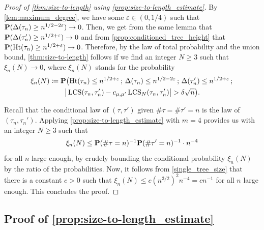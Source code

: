 \documentclass[11pt,reqno]{amsart}
\newcommand{\Ht}{\mathrm{Ht}}
\newcommand{\LCS}{\operatorname{LCS}}
\begin{document}
\begin{proof}[Proof of \cref{thm:size-to-length} using \cref{prop:size-to-length_estimate}]
By \cref{lem:maximum_degree}, we have some $\varepsilon \in (0,1/4)$ such that $\P(\Delta(\tau_n)\geq n^{1/2-2\varepsilon})\to 0$. Then, we get from the same lemma that $\P(\Delta(\tau_n')\geq n^{1/2+\varepsilon})\to 0$ and from \cref{prop:conditioned_tree_height} that $\P(\Ht(\tau_n)\geq n^{1/2+\varepsilon})\to 0$. Therefore, by the law of total probability and the union bound, \cref{thm:size-to-length} follows if we find an integer $N\geq 3$ such that $\xi_n(N)\to 0$, where $\xi_n(N)$ stands for the probability
\begin{multline*}
\xi_n(N) \coloneqq \P\big(\Ht(\tau_n)\leq n^{1/2+\varepsilon} \, ;\, \Delta(\tau_n)\leq n^{1/2-2\varepsilon}\, ;\, \Delta(\tau_n')\leq n^{1/2+\varepsilon}\, ;\, \\
\big|\LCS(\tau_n,\tau_n') - c_{\mu,\mu'}\LCS_N(\tau_n,\tau_n')\big|>\delta\sqrt{n}\big).
\end{multline*}

Recall that the conditional law of $(\tau,\tau')$ given $\#\tau=\#\tau'=n$ is the law of $(\tau_n,\tau_n')$. Applying \cref{prop:size-to-length_estimate} with $m=4$ provides us with an integer $N\geq 3$ such that
\[\xi_n(N)\leq  \P(\#\tau=n)^{-1}\P(\#\tau'=n)^{-1}\cdot n^{-4}\]
for all $n$ large enough, by crudely bounding the conditional probability $\xi_n(N)$ by the ratio of the probabilities. Now, it follows from \cref{single_tree_size} that there is a constant $c>0$ such that $\xi_n(N)\leq c( n^{3/2})^2 n^{-4}= cn^{-1}$ for all $n$ large enough. This concludes the proof.
\end{proof}



\subsection{Proof of \cref{prop:size-to-length_estimate}}
\end{document}
